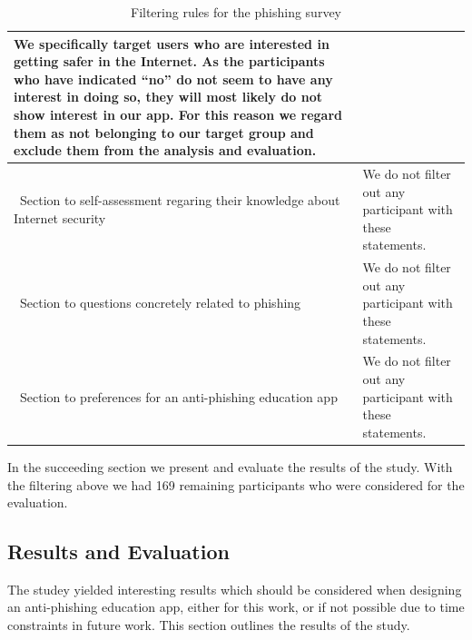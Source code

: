 \begin{table}[hHtbp]
\begin{tabular}{ | p{5cm} | p{10cm} |}
 We specifically target users who are interested in getting safer in the Internet.
 As the participants who have indicated ``no'' do not seem to have any interest in doing so, they will most likely do not show interest in our app.
 For this reason we regard them as not belonging to our target group and exclude them from the analysis and evaluation.
\\
    \hline\  Section to self-assessment regaring their knowledge about Internet security &  We do not filter out any participant with these statements.
\\
		\hline\  Section to questions concretely related to phishing & We do not filter out any participant with these statements.
 \\
    \hline\  Section to preferences for an anti-phishing education app & We do not filter out any participant with these statements.
\\
    \hline
    \end{tabular}
    \caption{Filtering rules for the phishing survey}
    \label{table:prestudy_filter}
    
\end{table}

In the succeeding section we present and evaluate the results of the study.
 With the filtering above we had 169 remaining participants who were considered for the evaluation.

\subsection{Results and Evaluation}
The studey yielded interesting results which should be considered when designing an anti-phishing education app, either for this work, or if not possible due to time constraints in future work.
 This section outlines the results of the study.


